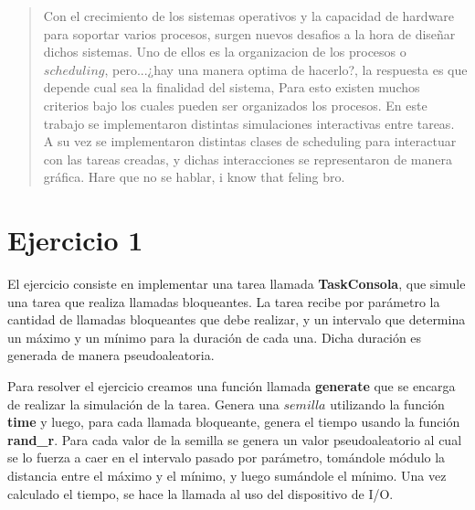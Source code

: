 \documentclass[11pt]{article}
\begin{document}
\subtitulo{}

\fecha{\today}

\grupo{}


\maketitle

\thispagestyle{empty}
\vspace{3cm}
\tableofcontents
\newpage
\vfill

\begin{abstract}
Con el crecimiento de los sistemas operativos y la capacidad de hardware para soportar varios procesos, surgen nuevos desafios a la hora de diseñar dichos sistemas. Uno de ellos es la organizacion de los procesos o $scheduling$, pero...¿hay una manera optima de hacerlo?, la respuesta es que depende cual sea la finalidad del sistema, Para esto existen muchos criterios bajo los cuales pueden ser organizados los procesos. 
 En este trabajo se implementaron distintas simulaciones interactivas entre tareas. A su vez se implementaron distintas clases de scheduling para interactuar 
 con las tareas creadas, y dichas interacciones se representaron de manera gráfica.
  Hare que no se hablar, i know that feling bro.
\end{abstract}

\newpage

\section{Ejercicio 1}

El ejercicio consiste en implementar una tarea llamada \textbf{TaskConsola}, que simule una tarea que realiza llamadas bloqueantes. La tarea 
recibe por parámetro la cantidad de llamadas bloqueantes que debe realizar, y un intervalo que determina un máximo y un mínimo para la duración 
de cada una. Dicha duración es generada de manera pseudoaleatoria.

Para resolver el ejercicio creamos una función llamada \textbf{generate} que se encarga de realizar la simulación de la tarea. Genera una $semilla$ utilizando la función 
\textbf{time} y luego, para cada llamada bloqueante, genera el tiempo usando la función \textbf{rand\_r}. Para cada valor de la semilla 
se genera un valor pseudoaleatorio al cual se lo fuerza a caer en el intervalo pasado por parámetro, tomándole módulo la distancia entre el máximo y 
el mínimo, y luego sumándole el mínimo. Una vez calculado el tiempo, se hace la llamada al uso del dispositivo de I/O.
\end{document}
